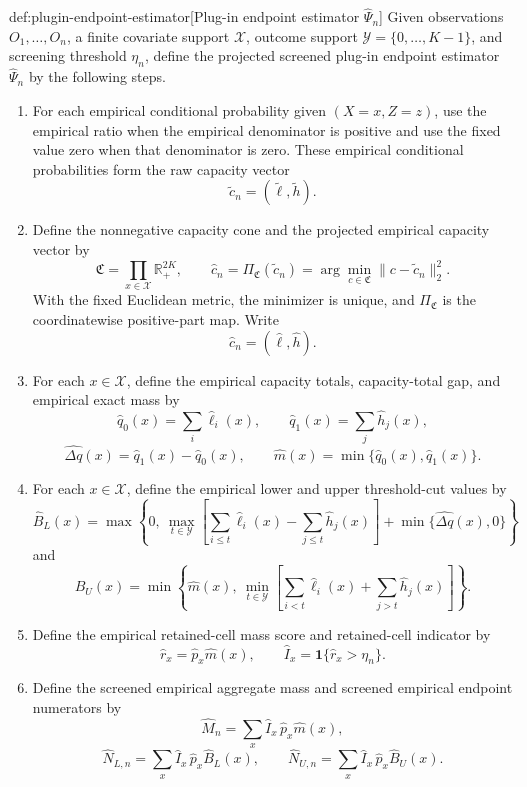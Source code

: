 \documentclass[11pt]{article}
\begin{document}
\begin{algorithmv}{def:plugin-endpoint-estimator}[Plug-in endpoint estimator \(\widehat\Psi_n\)]
Given observations \(O_1,\ldots,O_n\), a finite covariate support \(\mathcal X\), outcome support \(\mathcal Y=\{0,\ldots,K-1\}\), and screening threshold \(\eta_n\), define the projected screened plug-in endpoint estimator \(\widehat\Psi_n\) by the following steps.
\begin{enumerate}
\item For each empirical conditional probability given \((X=x,Z=z)\), use the empirical ratio when the empirical denominator is positive and use the fixed value zero when that denominator is zero. These empirical conditional probabilities form the raw capacity vector
\[
\widetilde c_n=(\widetilde\ell,\widetilde h).
\]

\item Define the nonnegative capacity cone and the projected empirical capacity vector by
\[
\mathfrak C=\prod_{x\in\mathcal X}\mathbb R_+^{2K},
\qquad
\widehat c_n
=\Pi_{\mathfrak C}(\widetilde c_n)
=\arg\min_{c\in\mathfrak C}\|c-\widetilde c_n\|_2^2.
\]
With the fixed Euclidean metric, the minimizer is unique, and \(\Pi_{\mathfrak C}\) is the coordinatewise positive-part map. Write
\[
\widehat c_n=(\widehat\ell,\widehat h).
\]

\item For each \(x\in\mathcal X\), define the empirical capacity totals, capacity-total gap, and empirical exact mass by
\[
\widehat q_0(x)=\sum_i\widehat\ell_i(x),
\qquad
\widehat q_1(x)=\sum_j\widehat h_j(x),
\]
\[
\widehat{\Delta q}(x)=\widehat q_1(x)-\widehat q_0(x),
\qquad
\widehat m(x)=\min\{\widehat q_0(x),\widehat q_1(x)\}.
\]

\item For each \(x\in\mathcal X\), define the empirical lower and upper threshold-cut values by
\[
\widehat B_L(x)=
\max\left\{
0,\ 
\max_{t\in\mathcal Y}
\left[
\sum_{i\le t}\widehat\ell_i(x)
-
\sum_{j\le t}\widehat h_j(x)
\right]
+
\min\{\widehat{\Delta q}(x),0\}
\right\}
\]
and
\[
\widehat B_U(x)=
\min\left\{
\widehat m(x),\ 
\min_{t\in\mathcal Y}
\left[
\sum_{i<t}\widehat\ell_i(x)
+
\sum_{j>t}\widehat h_j(x)
\right]
\right\}.
\]

\item Define the empirical retained-cell mass score and retained-cell indicator by
\[
\widehat r_x=\widehat p_x\widehat m(x),
\qquad
\widehat I_x=\mathbf 1\{\widehat r_x>\eta_n\}.
\]

\item Define the screened empirical aggregate mass and screened empirical endpoint numerators by
\[
\widehat M_n=\sum_x \widehat I_x\,\widehat p_x\widehat m(x),
\]
\[
\widehat N_{L,n}=\sum_x \widehat I_x\,\widehat p_x\widehat B_L(x),
\qquad
\widehat N_{U,n}=\sum_x \widehat I_x\,\widehat p_x\widehat B_U(x).
\]


\end{enumerate}
\end{algorithmv}
\end{document}
